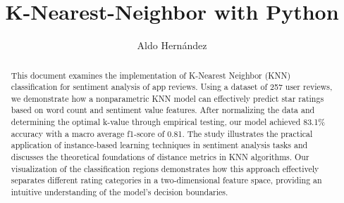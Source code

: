 \documentclass[10pt]{article}
\begin{document}
\begin{opening}
  \title{K-Nearest-Neighbor with Python}
  \author[Universidad Autónoma de Nuevo León, San Nicolás de los Garza, aldo.hernandezt@uanl.edu.mx]{Aldo Hernández}

  \begin{abstract}
    This document examines the implementation of K-Nearest Neighbor (KNN) classification for sentiment analysis of app reviews. Using a dataset of 257 user reviews, we demonstrate how a nonparametric KNN model can effectively predict star ratings based on word count and sentiment value features. After normalizing the data and determining the optimal k-value through empirical testing, our model achieved 83.1\% accuracy with a macro average f1-score of 0.81. The study illustrates the practical application of instance-based learning techniques in sentiment analysis tasks and discusses the theoretical foundations of distance metrics in KNN algorithms. Our visualization of the classification regions demonstrates how this approach effectively separates different rating categories in a two-dimensional feature space, providing an intuitive understanding of the model's decision boundaries.
  \end{abstract}

\end{opening}
\end{document}
